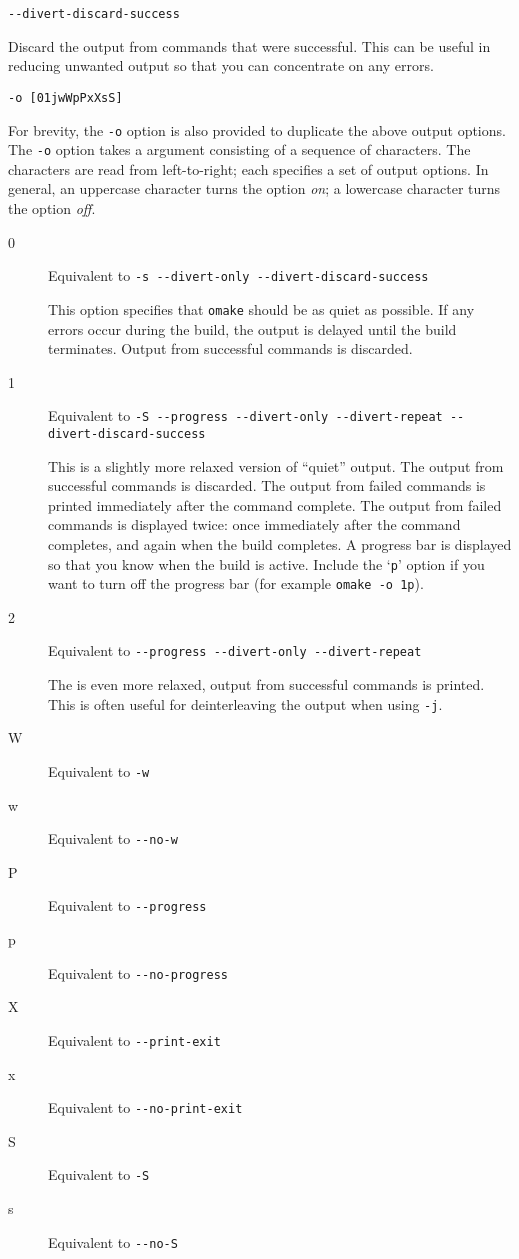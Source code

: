  \verb+--divert-discard-success+

Discard the output from commands that were successful.  This can be useful in reducing
unwanted output so that you can concentrate on any errors.

 \verb+-o [01jwWpPxXsS]+

For brevity, the \verb+-o+ option is also provided to duplicate the above output options.  The
\verb+-o+ option takes a argument consisting of a sequence of characters.  The characters are read
from left-to-right; each specifies a set of output options.  In general, an uppercase character turns
the option \emph{on}; a lowercase character turns the option \emph{off}.

\begin{description}
\item[0] Equivalent to \verb+-s --divert-only --divert-discard-success+

This option specifies that \verb+omake+ should be as quiet as possible.  If any errors occur
during the build, the output is delayed until the build terminates.  Output from successful commands
is discarded.

\item[1] Equivalent to \verb+-S --progress --divert-only --divert-repeat --divert-discard-success+

This is a slightly more relaxed version of ``quiet'' output.  The output from successful commands is
discarded.  The output from failed commands is printed immediately after the command complete.  The
output from failed commands is displayed twice: once immediately after the command completes, and
again when the build completes.  A progress bar is displayed so that you know when the build is
active.  Include the `\verb+p+' option if you want to turn off the progress bar (for example
\verb+omake -o 1p+).

\item[2] Equivalent to \verb+--progress --divert-only --divert-repeat+

The is even more relaxed, output from successful commands is printed.
This is often useful for deinterleaving the output when using \verb+-j+.

\item[W] Equivalent to \verb+-w+
\item[w] Equivalent to \verb+--no-w+
\item[P] Equivalent to \verb+--progress+
\item[p] Equivalent to \verb+--no-progress+
\item[X] Equivalent to \verb+--print-exit+
\item[x] Equivalent to \verb+--no-print-exit+
\item[S] Equivalent to \verb+-S+
\item[s] Equivalent to \verb+--no-S+
\end{description}

